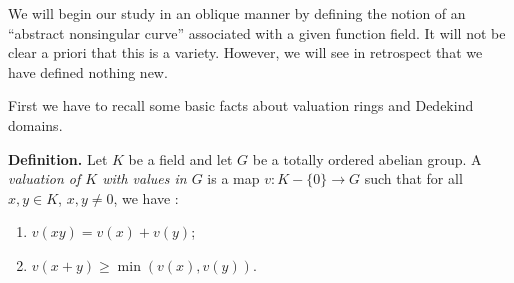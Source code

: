 {We will begin our study in an oblique manner by defining the notion of an \textquotedblleft{}abstract nonsingular curve\textquotedblright{} associated with a given function field. It will not be clear a priori that this is a variety. However, we will see in retrospect that we have defined nothing new.

First we have to recall some basic facts about valuation rings and Dedekind domains.

\smallskip
\noindent\hypertarget{err-I-6-valuation}{}\textbf{Definition.} Let $K$ be a field and let $G$ be a totally ordered abelian group. A \emph{valuation of $K$ with values in $G$} is a map $v\colon K-\{0\}\to G$ such that for all $x,y\in K$, $x,y\ne0$, we have \EditionText{}:
\begin{enumerate}[label=(\arabic*),leftmargin=2.4em,nosep]
\item $v(xy)=v(x)+v(y)$;
\item $v(x+y)\ge\min(v(x),v(y))$.
\end{enumerate}}
